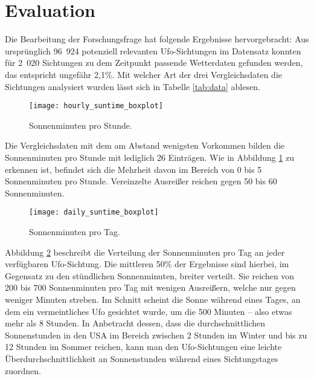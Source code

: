 \section{Evaluation} \label{evaluation}

Die Bearbeitung der Forschungsfrage hat folgende Ergebnisse hervorgebracht: Aus ursprünglich 96~924 potenziell relevanten Ufo-Sichtungen im Datensatz konnten für 2~020 Sichtungen zu dem Zeitpunkt passende Wetterdaten gefunden werden, das entspricht ungefähr 2,1\%. Mit welcher Art der drei Vergleichsdaten die Sichtungen analysiert wurden lässt sich in Tabelle \ref{tab:data} ablesen.

\begin{figure}[t]
    \centering
    \texttt{[image: hourly\_suntime\_boxplot]}
    \caption{Sonnenminuten pro Stunde.}
    \label{fig:hourly_suntime}
\end{figure}

Die Vergleichsdaten mit dem am Abstand wenigsten Vorkommen bilden die Sonnenminuten pro Stunde mit lediglich 26 Einträgen. Wie in Abbildung \ref{fig:hourly_suntime} zu erkennen ist, befindet sich die Mehrheit davon im Bereich von 0 bis 5 Sonnenminuten pro Stunde. Vereinzelte Ausreißer reichen gegen 50 bis 60 Sonnenminuten.%

\begin{figure}[t]
    \centering
    \texttt{[image: daily\_suntime\_boxplot]}
    \caption{Sonnenminuten pro Tag.}
    \label{fig:daily_suntime}
\end{figure}

Abbildung \ref{fig:daily_suntime} beschreibt die Verteilung der Sonnenminuten pro Tag an jeder verfügbaren Ufo-Sichtung. Die mittleren 50\% der Ergebnisse sind hierbei, im Gegensatz zu den stündlichen Sonnenminuten, breiter verteilt. Sie reichen von 200 bis 700 Sonnenminuten pro Tag mit wenigen Ausreißern, welche nur gegen weniger Minuten streben. Im Schnitt scheint die Sonne während eines Tages, an dem ein vermeintliches Ufo gesichtet wurde, um die 500 Minuten -- also etwas mehr als 8 Stunden. In Anbetracht dessen, dass die durchschnittlichen Sonnenstunden in den USA im Bereich zwischen 2 Stunden im Winter und bis zu 12 Stunden im Sommer reichen, kann man den Ufo-Sichtungen eine leichte Überdurchschnittlichkeit an Sonnenstunden während eines Sichtungstages zuordnen\cite{statista:2021}.

